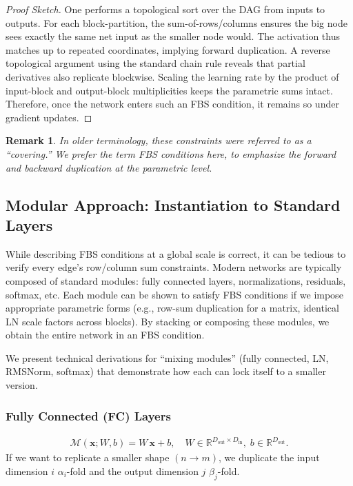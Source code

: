 \documentclass[11pt]{article}
\newtheorem{remark}{Remark}[section]
\begin{document}
\begin{proof}[Proof Sketch]
One performs a topological sort over the DAG from inputs to outputs. For each block-partition, the sum-of-rows/columns ensures the big node sees exactly the same net input as the smaller node would. The activation thus matches up to repeated coordinates, implying forward duplication. A reverse topological argument using the standard chain rule reveals that partial derivatives also replicate blockwise. Scaling the learning rate by the product of input-block and output-block multiplicities keeps the parametric sums intact. Therefore, once the network enters such an FBS condition, it remains so under gradient updates.
\end{proof}

\begin{remark}
In older terminology, these constraints were referred to as a ``covering.'' We prefer the term FBS conditions here, to emphasize the forward and backward duplication at the parametric level.
\end{remark}

\subsection{Modular Approach: Instantiation to Standard Layers}
While describing FBS conditions at a global scale is correct, it can be tedious to verify every edge's row/column sum constraints. Modern networks are typically composed of standard modules: fully connected layers, normalizations, residuals, softmax, etc. Each module can be shown to satisfy FBS conditions if we impose appropriate parametric forms (e.g., row-sum duplication for a matrix, identical LN scale factors across blocks). By stacking or composing these modules, we obtain the entire network in an FBS condition.

We present technical derivations for ``mixing modules'' (fully connected, LN, RMSNorm, softmax) that demonstrate how each can lock itself to a smaller version.

\subsubsection{Fully Connected (FC) Layers}
\begin{align*}
  \mathcal{M}(\mathbf{x};W,b)
  =
  W\,\mathbf{x} + b, 
  \quad
  W\in\mathbb{R}^{D_{\text{out}}\times D_{\text{in}}},\;
  b\in \mathbb{R}^{D_{\text{out}}}.
\end{align*}
If we want to replicate a smaller shape $(n \to m)$, we duplicate the input dimension $i$ $\alpha_i$-fold and the output dimension $j$ $\beta_j$-fold.
\end{document}

